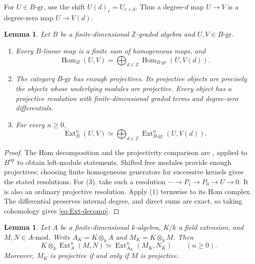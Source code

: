 \documentclass[11pt,a4paper]{article}
\numberwithin{equation}{section}
\theoremstyle{definition}
\theoremstyle{plain}
\newtheorem{lemma}[definition]{Lemma}
\theoremstyle{remark}
\DeclareMathOperator{\Ext}{Ext}
\DeclareMathOperator{\Hom}{Hom}
\newcommand{\Z}{\mathbb Z}
\newcommand{\gmod}[1]{#1\text{-}\mathrm{gr}}
\newcommand{\umod}[1]{#1\text{-}\mathrm{mod}}
\begin{document}
For \(U\in\gmod{B}\), use the shift \(U(d)_r=U_{r+d}\).
Thus a degree-\(d\) map \(U\to V\) is a degree-zero map \(U\to V(d)\).

\begin{lemma}\label{lem:graded-facts}
Let \(B\) be a finite-dimensional \(\Z\)-graded algebra and
\(U,V\in\gmod{B}\).
\begin{enumerate}
\item Every \(B\)-linear map is a finite sum of homogeneous maps, and
\[
 \Hom_B(U,V)=\bigoplus_{d\in\Z}\Hom_{\gmod{B}}(U,V(d)).
\]
\item The category \(\gmod{B}\) has enough projectives. Its projective
objects are precisely the objects whose underlying modules are
projective. Every object has a projective resolution with
finite-dimensional graded terms and degree-zero differentials.
\item For every \(n\geq0\),
\begin{equation}\label{eq:Ext-decomp}
 \Ext_B^n(U,V)\simeq
 \bigoplus_{d\in\Z}\Ext_{\gmod{B}}^n(U,V(d)).
\end{equation}
\end{enumerate}
\end{lemma}

\begin{proof}
The Hom decomposition and the projectivity comparison are
\cite[Theorem 1.2.6 and Proposition 1.2.15]{Hazrat16}, applied to
\(B^{\mathrm{op}}\) to obtain left-module statements. Shifted free
modules provide enough projectives; choosing finite homogeneous
generators for successive kernels gives the stated resolutions.
For (3), take such a resolution
\(\cdots\to P_1\to P_0\to U\to0\). It is also an ordinary projective
resolution. Apply (1) termwise to its Hom complex. The differential
preserves internal degree, and direct sums are exact, so taking
cohomology gives \eqref{eq:Ext-decomp}.
\end{proof}

\begin{lemma}\label{lem:base-change}
Let \(A\) be a finite-dimensional \(k\)-algebra, \(K/k\) a field
extension, and \(M,N\in\umod{A}\). Write \(A_K=K\otimes_k A\) and
\(M_K=K\otimes_kM\). Then
\begin{equation}\label{eq:base-Ext}
 K\otimes_k\Ext_A^n(M,N)\simeq\Ext_{A_K}^n(M_K,N_K)
 \qquad(n\geq0).
\end{equation}
Moreover, \(M_K\) is projective if and only if \(M\) is projective.
\end{lemma}
\end{document}
